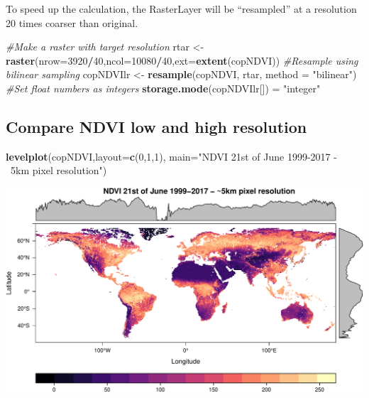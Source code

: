 \documentclass[
]{article}
\newenvironment{Shaded}{\begin{snugshade}}{\end{snugshade}}
\newcommand{\CommentTok}[1]{\textcolor[rgb]{0.56,0.35,0.01}{\textit{#1}}}
\newcommand{\DataTypeTok}[1]{\textcolor[rgb]{0.13,0.29,0.53}{#1}}
\newcommand{\DecValTok}[1]{\textcolor[rgb]{0.00,0.00,0.81}{#1}}
\newcommand{\KeywordTok}[1]{\textcolor[rgb]{0.13,0.29,0.53}{\textbf{#1}}}
\newcommand{\NormalTok}[1]{#1}
\newcommand{\OperatorTok}[1]{\textcolor[rgb]{0.81,0.36,0.00}{\textbf{#1}}}
\newcommand{\StringTok}[1]{\textcolor[rgb]{0.31,0.60,0.02}{#1}}
\begin{document}
To speed up the calculation, the RasterLayer will be ``resampled'' at a
resolution 20 times coarser than original.

\begin{Shaded}
\begin{Highlighting}[]
\CommentTok{#Make a raster with target resolution}
\NormalTok{rtar <-}\StringTok{ }\KeywordTok{raster}\NormalTok{(}\DataTypeTok{nrow=}\DecValTok{3920}\OperatorTok{/}\DecValTok{40}\NormalTok{,}\DataTypeTok{ncol=}\DecValTok{10080}\OperatorTok{/}\DecValTok{40}\NormalTok{,}\DataTypeTok{ext=}\KeywordTok{extent}\NormalTok{(copNDVI))}
\CommentTok{#Resample using bilinear sampling}
\NormalTok{copNDVIlr <-}\StringTok{ }\KeywordTok{resample}\NormalTok{(copNDVI, rtar, }\DataTypeTok{method =} \StringTok{"bilinear"}\NormalTok{)}
\CommentTok{#Set float numbers as integers}
\KeywordTok{storage.mode}\NormalTok{(copNDVIlr[]) =}\StringTok{ "integer"}
\end{Highlighting}
\end{Shaded}

\hypertarget{compare-ndvi-low-and-high-resolution}{%
\subsection{Compare NDVI low and high
resolution}\label{compare-ndvi-low-and-high-resolution}}

\begin{Shaded}
\begin{Highlighting}[]
\KeywordTok{levelplot}\NormalTok{(copNDVI,}\DataTypeTok{layout=}\KeywordTok{c}\NormalTok{(}\DecValTok{0}\NormalTok{,}\DecValTok{1}\NormalTok{,}\DecValTok{1}\NormalTok{), }\DataTypeTok{main=}\StringTok{"NDVI 21st of June 1999-2017 - ~5km pixel resolution"}\NormalTok{)}
\end{Highlighting}
\end{Shaded}

\begin{center}\includegraphics[width=0.95\linewidth]{vignettes_rasterdiv_files/figure-latex/fig01-1} \end{center}
\end{document}
